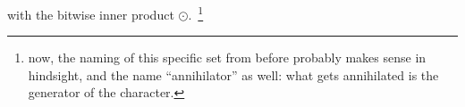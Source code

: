 with the bitwise inner product $\odot$.~\footnote{now, the naming of this specific set from before probably makes sense in hindsight, and the name ``annihilator'' as well: what gets annihilated is the generator of the character. }
